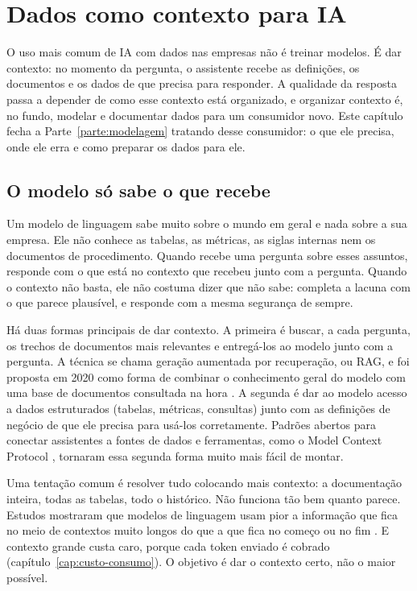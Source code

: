 \chapter{Dados como contexto para IA}
\label{cap:contexto-ia}

O uso mais comum de IA com dados nas empresas não é treinar modelos. É dar contexto: no
momento da pergunta, o assistente recebe as definições, os documentos e os dados de que
precisa para responder. A qualidade da resposta passa a depender de como esse contexto está
organizado, e organizar contexto é, no fundo, modelar e documentar dados para um consumidor
novo. Este capítulo fecha a Parte~\ref{parte:modelagem} tratando desse consumidor: o que ele
precisa, onde ele erra e como preparar os dados para ele.

\section{O modelo só sabe o que recebe}
\label{sec:modelo-so-sabe}

Um modelo de linguagem sabe muito sobre o mundo em geral e nada sobre a sua empresa. Ele não
conhece as tabelas, as métricas, as siglas internas nem os documentos de procedimento. Quando
recebe uma pergunta sobre esses assuntos, responde com o que está no contexto que recebeu
junto com a pergunta. Quando o contexto não basta, ele não costuma dizer que não sabe: completa
a lacuna com o que parece plausível, e responde com a mesma segurança de sempre.

Há duas formas principais de dar contexto. A primeira é buscar, a cada pergunta, os trechos de
documentos mais relevantes e entregá-los ao modelo junto com a pergunta. A técnica se chama
geração aumentada por recuperação, ou RAG, e foi proposta em 2020 como forma de combinar o
conhecimento geral do modelo com uma base de documentos consultada na hora
\parencite{lewis2020}. A segunda é dar ao modelo acesso a dados estruturados (tabelas,
métricas, consultas) junto com as definições de negócio de que ele precisa para usá-los
corretamente. Padrões abertos para conectar assistentes a fontes de dados e ferramentas, como
o Model Context Protocol \parencite{anthropic2024mcp}, tornaram essa segunda forma muito mais
fácil de montar.

Uma tentação comum é resolver tudo colocando mais contexto: a documentação inteira, todas as
tabelas, todo o histórico. Não funciona tão bem quanto parece. Estudos mostraram que modelos de
linguagem usam pior a informação que fica no meio de contextos muito longos do que a que fica
no começo ou no fim \parencite{liu2024}. E contexto grande custa caro, porque cada token
enviado é cobrado (capítulo~\ref{cap:custo-consumo}). O objetivo é dar o contexto certo, não o
maior possível.

